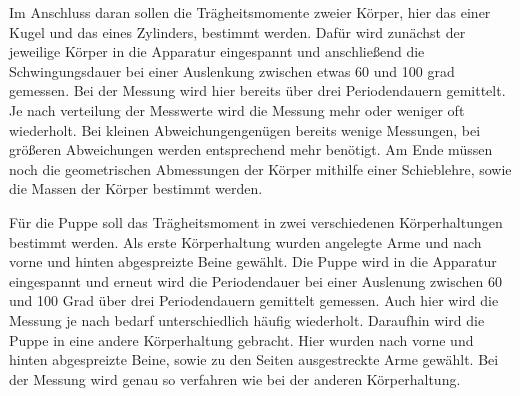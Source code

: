 Im Anschluss daran sollen die Trägheitsmomente zweier Körper, hier das einer Kugel und
das eines Zylinders, bestimmt werden. Dafür wird zunächst der jeweilige Körper in
die Apparatur eingespannt und anschließend die Schwingungsdauer bei einer Auslenkung
zwischen etwas 60 und 100 grad gemessen. Bei der Messung wird hier bereits über drei
Periodendauern gemittelt. Je nach verteilung der Messwerte wird die Messung mehr
oder weniger oft wiederholt. Bei kleinen Abweichungengenügen bereits wenige Messungen,
bei größeren Abweichungen werden entsprechend mehr benötigt. Am Ende müssen noch die
geometrischen Abmessungen der Körper mithilfe einer Schieblehre, sowie die Massen der
Körper bestimmt werden.

Für die Puppe soll das Trägheitsmoment in zwei verschiedenen Körperhaltungen bestimmt
werden. Als erste Körperhaltung wurden angelegte Arme und nach vorne und hinten
abgespreizte Beine gewählt. Die Puppe wird in die Apparatur eingespannt und erneut
wird die Periodendauer bei einer Auslenung zwischen 60 und 100 Grad über drei
Periodendauern gemittelt gemessen. Auch hier wird die Messung je nach bedarf
unterschiedlich häufig wiederholt. Daraufhin wird die Puppe in eine andere
Körperhaltung gebracht. Hier wurden nach vorne und hinten abgespreizte Beine,
sowie zu den Seiten ausgestreckte Arme gewählt. Bei der Messung wird genau so
verfahren wie bei der anderen Körperhaltung.
